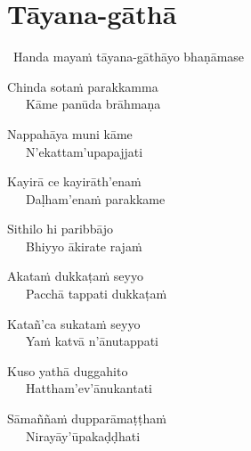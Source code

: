 
\section{Tāyana-gāthā}
\label{tayana-gatha}

\begin{intro}
	\anglebracketleft\ \hspace{-0.5mm}Handa mayaṁ tāyana-gāthāyo bhaṇāmase \hspace{-0.5mm}\anglebracketright\
\end{intro}


\begin{hanging-indent}
Chinda sotaṁ parakkamma\\
Kāme panūda brāhmaṇa
\end{hanging-indent}

\begin{hanging-indent}
Nappahāya muni kāme\\
N'ekattam'upapajjati
\end{hanging-indent}

\begin{hanging-indent}
Kayirā ce kayirāth'enaṁ\\
Daḷham'enaṁ parakkame
\end{hanging-indent}

\begin{hanging-indent}
Sithilo hi paribbājo\\
Bhiyyo ākirate rajaṁ
\end{hanging-indent}

\begin{hanging-indent}
Akataṁ dukkaṭaṁ seyyo\\
Pacchā tappati dukkaṭaṁ
\end{hanging-indent}

\begin{hanging-indent}
Katañ'ca sukataṁ seyyo\\
Yaṁ katvā n'ānutappati
\end{hanging-indent}

\begin{hanging-indent}
Kuso yathā duggahito\\
Hattham'ev'ānukantati
\end{hanging-indent}

\ifninebythirteenversion \clearpage \fi

\begin{hanging-indent}
Sāmaññaṁ dupparāmaṭṭhaṁ\\
Nirayāy'ūpakaḍḍhati
\end{hanging-indent}


